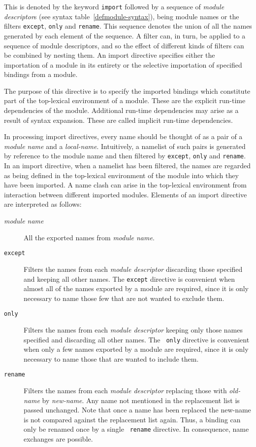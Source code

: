 \begin{optDefinition}
This is denoted by the keyword {\tt import} followed by a sequence of {\em
    module descriptor}s (see syntax table~\ref{defmodule-syntax}), being module
names or the filters {\tt except}, {\tt only} and {\tt rename}.  This sequence
denotes the union of all the names generated by each element of the sequence.  A
filter can, in turn, be applied to a sequence of module descriptors, and so the
effect of different kinds of filters can be combined by nesting them.  An import
directive specifies either the importation of a module in its entirety or the
selective importation of specified bindings from a module.

The purpose of this directive is to specify the imported bindings which
constitute part of the top-lexical environment of a module.  These are the
explicit run-time dependencies of the module.  Additional run-time dependencies
may arise as a result of syntax expansion.  These are called implicit run-time
dependencies.

In processing import directives, every name should be thought of as a pair of a
{\em module name} and a {\em local-name}.  Intuitively, a namelist of such pairs
is generated by reference to the module name and then filtered by {\tt except},
{\tt only} and {\tt rename}.  In an import directive, when a namelist has been
filtered, the names are regarded as being defined in the top-lexical environment
of the module into which they have been imported.  A name clash can arise in the
top-lexical environment from interaction between different imported modules.
Elements of an import directive are interpreted as follows:
%
\begin{description}
    \item[{\em module name}] All the exported names from {\em module name}.

    \item[{\tt except}] Filters the names from each {\em module descriptor}
    discarding those specified and keeping all other names.  The {\tt except}
    directive is convenient when almost all of the names exported by a module
    are required, since it is only necessary to name those few that are not
    wanted to exclude them.

    \item[{\tt only}] Filters the names from each {\em module descriptor}
    keeping only those names specified and discarding all other names.  The {\tt
        only} directive is convenient when only a few names exported by a module
    are required, since it is only necessary to name those that are wanted to
    include them.

    \item[{\tt rename}] Filters the names from each {\em module descriptor}
    replacing those with {\em old-name} by {\em new-name}.  Any name not
    mentioned in the replacement list is passed unchanged.  Note that once a
    name has been replaced the new-name is not compared against the replacement
    list again.  Thus, a binding can only be renamed once by a single {\tt
        rename} directive.  In consequence, name exchanges are possible.
\end{description}
\end{optDefinition}
